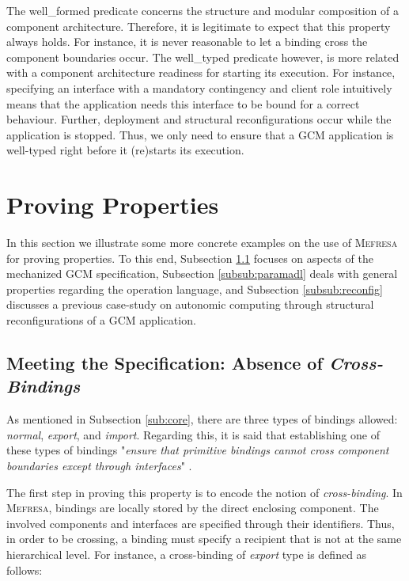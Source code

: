    		The \textsf{well\_formed} predicate concerns the structure and 
   	modular composition of a \textsf{component} architecture. Therefore, it is legitimate to expect that this property
   	always holds. For instance, it is never reasonable to let a \textsf{binding} cross the
	\textsf{component} boundaries occur. The \textsf{well\_typed} 
   	predicate however, is more related with a \textsf{component} architecture readiness 
   	for starting its execution. For instance, specifying an \textsf{interface} with a \textsf{mandatory} \textsf{contingency}
   	and \textsf{client} \textsf{role} intuitively means that the application needs this \textsf{interface} to be bound
   	for a correct behaviour. Further, deployment and structural reconfigurations occur while the application is
   	stopped. Thus, we only need to ensure that a \ac{GCM} application is well-typed right before it
   	(re)starts its execution.	


\section{Proving Properties}
\label{sub:ex}


		In this section we illustrate some more concrete examples on the use of \textsc{Mefresa}
	for proving properties. To this end, Subsection \ref{subsub:cross} focuses on aspects of the
 	mechanized \ac{GCM} specification, Subsection \ref{subsub:paramadl} deals with general properties
 	regarding the \textsf{operation} language, and Subsection \ref{subsub:reconfig} discusses
 	a previous case-study on autonomic computing through 
 	structural reconfigurations of a \ac{GCM} application.



\subsection{Meeting the Specification: Absence of \textit{Cross-Bindings}}
\label{subsub:cross}

	As mentioned in Subsection \ref{sub:core},  there are three types of \textsf{binding}s allowed:
	\textit{normal}, \textit{export}, and \textit{import}. Regarding this, it is said
	that establishing one of these types of \textsf{binding}s 
	"\textit{ensure that primitive bindings cannot cross component
boundaries except through interfaces}" \cite{fractalSpec}. 

The first step in proving this property is to encode the notion of
\textit{cross-binding}. In \textsc{Mefresa}, \textsf{binding}s are locally stored
by the direct enclosing \textsf{component}. The involved \textsf{component}s
and \textsf{interface}s are specified through their identifiers. Thus, in order to
be crossing, a \textsf{binding} must specify a recipient that is not at the same hierarchical level.
For instance, a cross-binding of
\textit{export} type is defined as follows:


